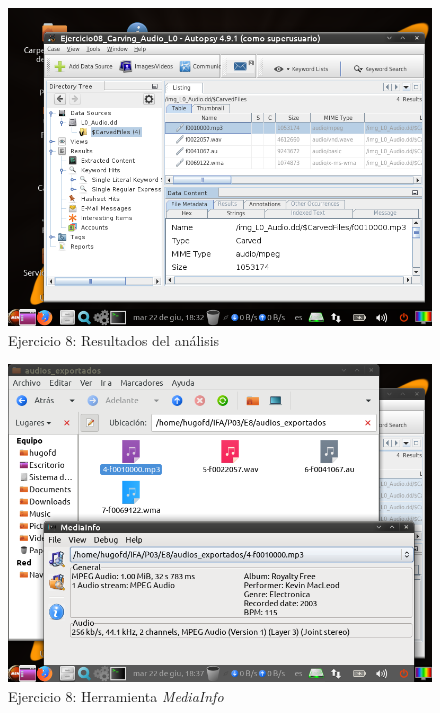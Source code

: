 \documentclass[11pt]{article}
\begin{document}
\begin{figure}[H]
    \caption{Ejercicio 8: Resultados del análisis}
    \centering
    \includegraphics[scale=0.7]{p03/e8-5.png}
\end{figure}

\begin{figure}[H]
    \caption{Ejercicio 8: Herramienta \textit{MediaInfo}}
    \centering
    \includegraphics[scale=0.7]{p03/e8-6.png}
\end{figure}
\end{document}
